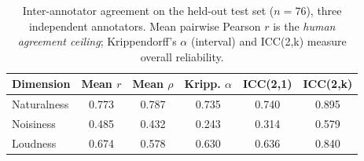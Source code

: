 \begin{table}[t]
\centering
\caption{Inter-annotator agreement on the held-out test set ($n{=}76$), three independent annotators. Mean pairwise Pearson $r$ is the \emph{human agreement ceiling}; Krippendorff's $\alpha$ (interval) and ICC(2,k) measure overall reliability.}
\label{tab:iaa}
\begin{tabular}{lccccc}
\toprule
Dimension & Mean $r$ & Mean $\rho$ & Kripp. $\alpha$ & ICC(2,1) & ICC(2,k) \\
\midrule
Naturalness & 0.773 & 0.787 & 0.735 & 0.740 & 0.895 \\
Noisiness & 0.485 & 0.432 & 0.243 & 0.314 & 0.579 \\
Loudness & 0.674 & 0.578 & 0.630 & 0.636 & 0.840 \\
\bottomrule
\end{tabular}
\end{table}